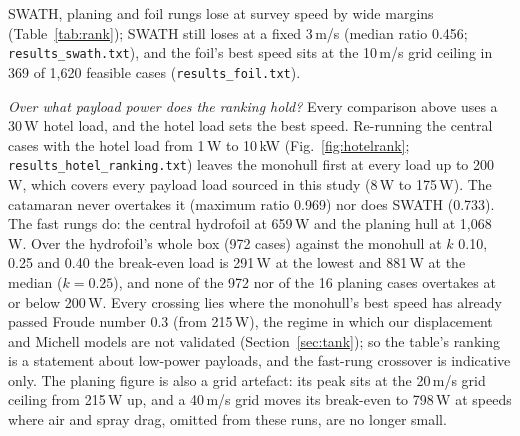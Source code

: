 \documentclass[conference]{IEEEtran}
\begin{document}
SWATH, planing and foil rungs lose at survey speed by wide margins (Table~\ref{tab:rank}); SWATH
still loses at a fixed 3\,m/s (median ratio 0.456; \texttt{results\_swath.txt}), and the foil's
best speed sits at the 10\,m/s grid ceiling in 369 of 1{,}620 feasible cases
(\texttt{results\_foil.txt}).

\emph{Over what payload power does the ranking hold?} Every comparison above uses a 30\,W hotel
load, and the hotel load sets the best speed. Re-running the central cases with the hotel load from
1\,W to 10\,kW (Fig.~\ref{fig:hotelrank}; \texttt{results\_hotel\_ranking.txt}) leaves the monohull
first at every load up to 200\,W, which covers every payload load sourced in this study (8\,W to
175\,W). The catamaran never overtakes it (maximum ratio 0.969) nor does SWATH (0.733). The fast
rungs do: the central hydrofoil at 659\,W and the planing hull at 1{,}068\,W. Over the hydrofoil's
whole box (972 cases) against the monohull at $k$ 0.10, 0.25 and 0.40 the break-even load is
291\,W at the lowest and 881\,W at the median ($k=0.25$), and none of the 972 nor of the 16 planing
cases overtakes at or below 200\,W. Every crossing lies where the monohull's best speed has already
passed Froude number 0.3 (from 215\,W), the regime in which our displacement and Michell models are
not validated (Section~\ref{sec:tank}); so the table's ranking is a statement about low-power
payloads, and the fast-rung crossover is indicative only. The planing figure is also a grid
artefact: its peak sits at the 20\,m/s grid ceiling from 215\,W up, and a 40\,m/s grid moves its
break-even to 798\,W at speeds where air and spray drag, omitted from these runs, are no longer small.
\end{document}
